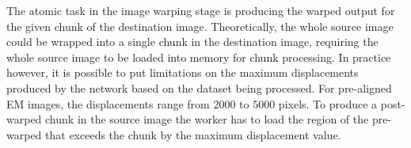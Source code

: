 \documentclass{article}
\begin{document}
The atomic task in the image warping stage is producing the warped output for the given chunk of the destination image. Theoretically, the whole source image could be wrapped into a single chunk in the destination image, requiring the whole source image to be loaded into memory for chunk processing. In practice however, it is possible to put limitations on the maximum displacements produced by the network based on the dataset being processed. For pre-aligned EM images, the displacements range from $2000$ to $5000$ pixels. To produce a post-warped chunk in the source image the worker has to load the region of the pre-warped that exceeds the chunk by the maximum displacement value. 
\end{document}
